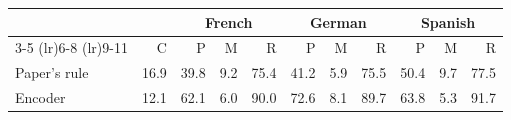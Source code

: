 \begin{tabular}{lrrrrrrrrrr}
    \toprule
    & & \multicolumn{3}{c}{French} & \multicolumn{3}{c}{German} & \multicolumn{3}{c}{Spanish} \\
    \cmidrule(lr){3-5} \cmidrule(lr){6-8} \cmidrule(lr){9-11}
    & \textsf{C} & \textsf{P} & \textsf{M} & \textsf{R} & \textsf{P} & \textsf{M} & \textsf{R} & \textsf{P} & \textsf{M} & \textsf{R} \\
    \midrule
    Paper's rule & 16.9 & 39.8 & 9.2 & 75.4 & 41.2 & 5.9 & 75.5 & 50.4 & 9.7 & 77.5 \\
    Encoder & 12.1 & 62.1 & 6.0 & 90.0 & 72.6 & 8.1 & 89.7 & 63.8 & 5.3 & 91.7 \\
    \bottomrule
\end{tabular}
